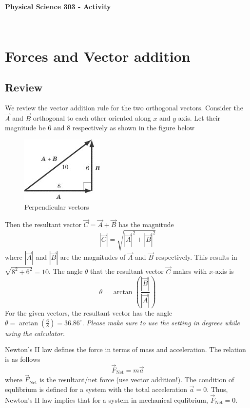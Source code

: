 \documentclass[10pt]{article}
\date{2014-6-22}
\begin{document}
\begin{center}
\begin{Large}\textbf{Physical Science 303 - Activity}\end{Large} \\
\smallskip
\end{center}

\section{Forces and Vector addition}
\subsection{Review}
We review the vector addition rule for the two orthogonal vectors.  Consider the $\vec{A}$ and $\vec{B}$ orthogonal to each other oriented along $x$ and $y$ axis.  Let their magnitude be $6$ and $8$ respectively as shown in the figure below
\begin{figure}[h]
\includegraphics[scale=.5]{perp_vec}
\centering
\caption{Perpendicular vectors}
\centering
\end{figure}

Then the resultant vector $\vec{C}=\vec{A}+\vec{B}$ has the magnitude 
\begin{equation}
  |\vec{C}|=\sqrt{|\vec{A}|^2+|\vec{B}|^2}
\end{equation}  
where $|\vec{A}|$ and $|\vec{B}|$ are the magnitudes of $\vec{A}$ and $\vec{B}$ respectively.  This results in $\sqrt{8^2+6^2}=10$.
The angle $\theta$ that the resultant vector $\vec{C}$ makes with $x$-axis is 
\begin{equation}
  \theta = \arctan\left(\frac{|\vec{B}|}{|\vec{A}|}\right)
\end{equation}
For the given vectors, the resultant vector has the angle $\theta=\arctan\left(\frac{6}{8}\right)=36.86^\circ$.
\emph{Please make sure to use the setting in degrees while using the calculator}.

Newton's II law defines the force in terms of mass and acceleration.  The relation is as follows
\begin{equation}
  \vec{F}_{\text{Net}}=m\vec{a}
\end{equation}
where $\vec{F}_{\text{Net}}$ is the resultant/net force (use vector addition!). 
The condition of equlibrium is defined for a system with the total acceleration $\vec{a}=0$.  Thus, Newton's II law implies that for a system in mechanical equlibrium, $\vec{F}_{\text{Net}}=0$.
\end{document}
